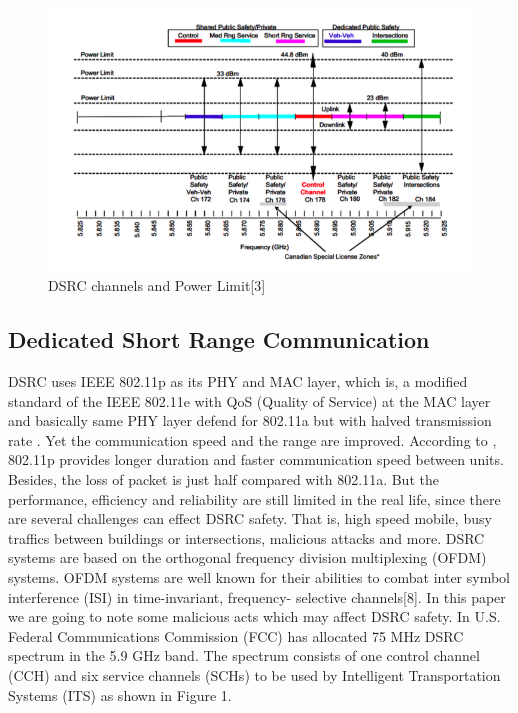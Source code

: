 \documentclass[conference]{IEEEtran}
\begin{document}
\begin{figure}[h]
  \includegraphics[width=\linewidth]{Fig-Channel-power.png}
  \caption{DSRC channels and Power Limit[3]}
  \label{fig:channel}
\end{figure}

\subsection{Dedicated Short Range Communication}
DSRC uses IEEE 802.11p as its PHY and MAC layer, which is, a modified standard of the IEEE 802.11e with QoS (Quality of Service) at the MAC layer and basically same PHY layer defend for 802.11a but with halved transmission rate . Yet the communication speed and the range are improved. According to \cite{W2010}, 802.11p provides longer duration and faster communication speed between units. Besides, the loss of packet is just half compared with 802.11a. But the performance, efficiency and reliability are still limited in the real life, since there are several challenges can effect DSRC safety. That is, high speed mobile, busy traffics between buildings or intersections, malicious attacks and more. DSRC systems are based on the orthogonal frequency division multiplexing (OFDM) systems. OFDM systems are well known for their abilities to combat inter symbol interference (ISI) in time-invariant, frequency- selective channels[8]. In this paper we are going to note some malicious acts which may affect DSRC safety.
In U.S. Federal Communications Commission (FCC) has allocated 75 MHz DSRC spectrum in the 5.9 GHz band. The spectrum consists of one control channel (CCH) and six service channels (SCHs) to be used by Intelligent Transportation Systems (ITS) as shown in Figure 1.
\end{document}
